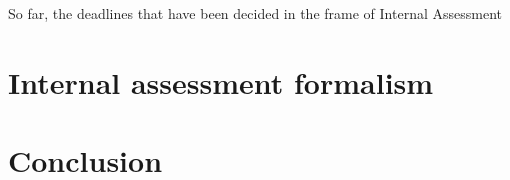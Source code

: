 \documentclass{template/openetcs_article}
\begin{document}
So far, the deadlines that have been decided in the frame of Internal Assessment

\section{Internal assessment formalism}

\section{Conclusion}




\end{document}
